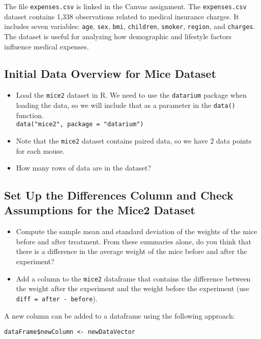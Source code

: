 \documentclass{article}
\begin{document}
The file \texttt{expenses.csv} is linked in the Canvas assignment.
The \texttt{expenses.csv} dataset contains 1,338 observations related to medical insurance charges. It includes seven variables: \texttt{age}, \texttt{sex}, \texttt{bmi}, \texttt{children}, \texttt{smoker}, \texttt{region}, and \texttt{charges}. The dataset is useful for analyzing how demographic and lifestyle factors influence medical expenses.
\subsection*{Initial Data Overview for Mice Dataset}

\begin{itemize}
    \item Load the \texttt{mice2} dataset in R. We need to use the \texttt{datarium} package when loading the data, so we will include that as a parameter in the \texttt{data()} function. \\
    \texttt{data("mice2", package = "datarium")}
    \item Note that the \texttt{mice2} dataset contains paired data, so we have 2 data points for each mouse.
    \item How many rows of data are in the dataset?
\end{itemize}

\subsection*{Set Up the Differences Column and Check Assumptions for the Mice2 Dataset}

\begin{itemize}
    \item Compute the sample mean and standard deviation of the weights of the mice before and after treatment. From these summaries alone, do you think that there is a difference in the average weight of the mice before and after the experiment?
    \item Add a column to the \texttt{mice2} dataframe that contains the difference between the weight after the experiment and the weight before the experiment (use \texttt{diff = after - before}).
\end{itemize}

A new column can be added to a dataframe using the following approach:

\begin{center}
    \texttt{dataFrame\$newColumn <- newDataVector}
\end{center}
\end{document}
